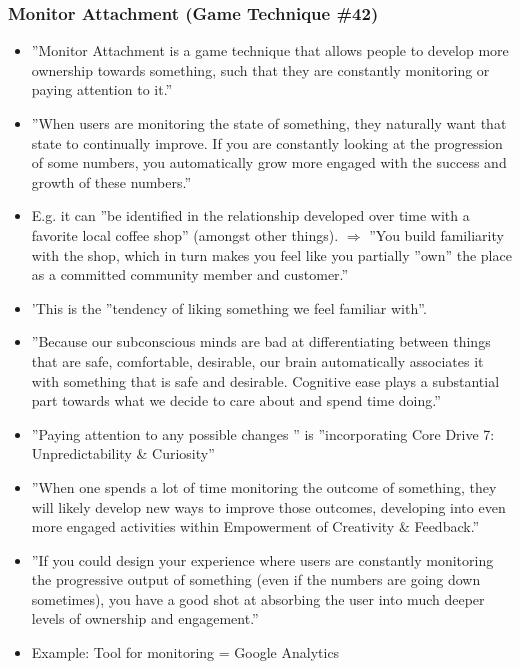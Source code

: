 \subsubsection{Monitor Attachment (Game Technique \#42)}
    \begin{itemize}
        \item ''Monitor Attachment is a game technique that allows people to develop more ownership towards something, such that they are constantly monitoring or paying attention to it.''
        \item ''When users are monitoring the state of something, they naturally want that state to continually improve. If you are constantly looking at the progression of some numbers, you automatically grow more engaged with the success and growth of these numbers.''
        \item E.g. it can ''be identified in the relationship developed over time with a favorite local coffee shop'' (amongst other things). $\Rightarrow$ ''You build familiarity with the shop, which in turn makes you feel like you partially ''own'' the place as a committed community member and customer.''
        \item 'This is the ''tendency of liking something we feel familiar with''.
        \item ''Because our subconscious minds are bad at differentiating between things that are safe, comfortable, desirable, our brain automatically associates it with something that is safe and desirable. Cognitive ease plays a substantial part towards what we decide to care about and spend time doing.''
        \item ''Paying attention to any possible changes '' is ''incorporating Core Drive 7: Unpredictability \& Curiosity''
        \item ''When one spends a lot of time  monitoring the outcome of something, they will likely develop new ways to improve those outcomes, developing into even more engaged activities within Empowerment of Creativity \& Feedback.''
        \item ''If you could design your experience where users are constantly monitoring the progressive output of something (even if the numbers are going down sometimes), you have a good shot at absorbing the user into much deeper levels of ownership and engagement.''
        \item Example: Tool for monitoring = Google Analytics
    \end{itemize}
    
